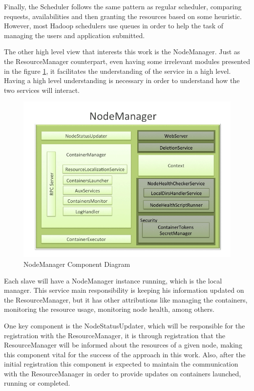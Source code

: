 Finally, the Scheduler follows the same pattern as regular scheduler, comparing requests, availabilities and then granting the resources based on some heuristic. However, most Hadoop schedulers use queues in order to help the task of managing the users and application submitted.

The other high level view that interests this work is the NodeManager. Just as the ResourceManager counterpart, even having some irrelevant modules presented in the figure \ref{fig:NMHorton}, it facilitates the understanding of the service in a high level. Having a high level understanding is necessary in order to understand how the two services will interact.

\begin{figure}[hbtn]
   \renewcommand{\figurename}{Figure}
   \centering
   \includegraphics[width=15cm]{figuras/Figura15-NMHorton.png}
   \caption{NodeManager Component Diagram \cite{HortonNM}}
   \label{fig:NMHorton}
\end{figure}

Each slave will have a NodeManager instance running, which is the local manager. This service main responsibility is keeping his information updated on the ResourceManager, but it has other attributions like managing the containers, monitoring the resource usage, monitoring node health, among others.

One key component is the NodeStatusUpdater, which will be responsible for the registration with the ResourceManager, it is through registration that the ResourceManager will be informed about the resources of a given node, making this component vital for the success of the approach in this work. Also, after the initial registration this component is expected to maintain the communication with the ResourceManager in order to provide updates on containers launched, running or completed.

